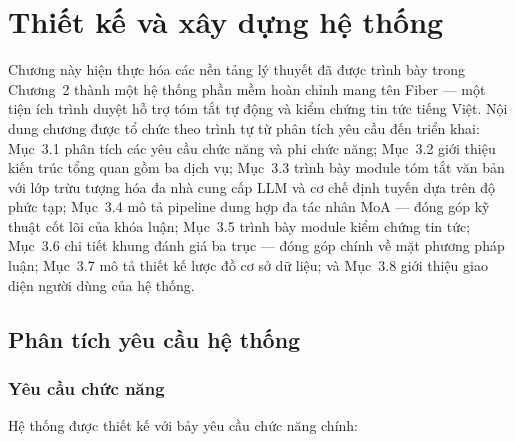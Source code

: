 \chapter{Thiết kế và xây dựng hệ thống}

Chương này hiện thực hóa các nền tảng lý thuyết đã được trình bày trong Chương~2 thành một hệ thống phần mềm hoàn chỉnh mang tên Fiber --- một tiện ích trình duyệt hỗ trợ tóm tắt tự động và kiểm chứng tin tức tiếng Việt. Nội dung chương được tổ chức theo trình tự từ phân tích yêu cầu đến triển khai: Mục~3.1 phân tích các yêu cầu chức năng và phi chức năng; Mục~3.2 giới thiệu kiến trúc tổng quan gồm ba dịch vụ; Mục~3.3 trình bày module tóm tắt văn bản với lớp trừu tượng hóa đa nhà cung cấp LLM và cơ chế định tuyến dựa trên độ phức tạp; Mục~3.4 mô tả pipeline dung hợp đa tác nhân MoA --- đóng góp kỹ thuật cốt lõi của khóa luận; Mục~3.5 trình bày module kiểm chứng tin tức; Mục~3.6 chi tiết khung đánh giá ba trục --- đóng góp chính về mặt phương pháp luận; Mục~3.7 mô tả thiết kế lược đồ cơ sở dữ liệu; và Mục~3.8 giới thiệu giao diện người dùng của hệ thống.

\section{Phân tích yêu cầu hệ thống}

\subsection{Yêu cầu chức năng}

Hệ thống được thiết kế với bảy yêu cầu chức năng chính: 

